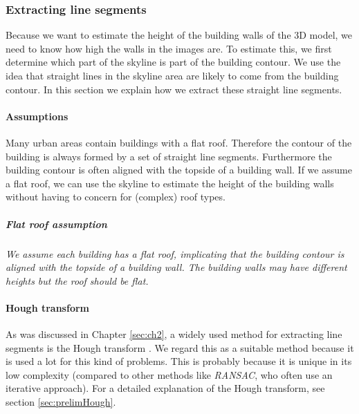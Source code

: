 



\subsubsection{Extracting line segments}
\label{extractinglinesegments}
	Because we want to estimate the height of the building walls of the 3D
	model, we need to know how high the walls in the images are.  To estimate
	this, we first determine which part of the skyline is part of the building
	contour.  We use the idea that straight lines in the skyline area are likely
	to come from the building contour. In this section we explain how we extract
	these straight line segments.

\paragraph{Assumptions}
	Many urban areas contain buildings with a flat roof. Therefore the contour
	of the building is always formed by a set of straight line segments.
	Furthermore the building contour is often aligned with the topside of a building wall.
	If we assume a flat roof, we can use the skyline to estimate the height of
	the building walls without having to concern for (complex) roof types.

	\subparagraph{Flat roof assumption}
	\emph{We assume each building has a flat roof, implicating that the building
	contour is aligned with the topside of a building wall.  The building walls
	may have different heights but the roof should be flat.}\\


\paragraph{Hough transform}
	As was discussed in Chapter \ref{sec:ch2}, a widely used method for extracting line segments is the Hough transform \cite{Hough}.
	We regard this as a suitable method because it is
	used a lot for this kind of problems. This is probably because it is unique
	in its low complexity (compared to other methods like
	\emph{RANSAC}, who often use an iterative approach).
	For a detailed explanation of the Hough transform, see section \ref{sec:prelimHough}.\\

